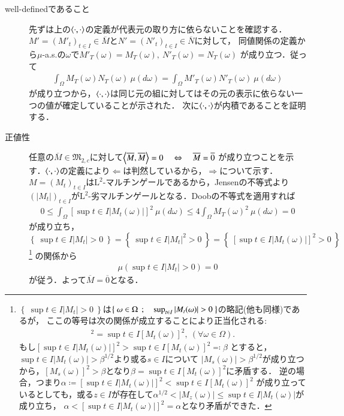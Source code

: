 \begin{description}
			\begin{prf}\mbox{}
				\begin{description}
					\item[well-definedであること]
						先ずは上の$\inprod<\cdot,\cdot>$の定義が代表元の取り方に依らないことを確認する．
						$M' = (M'_t)_{t \in I} \in \overline{M}$と$N' = (N'_t)_{t \in I} \in \overline{N}$に対して，
						同値関係の定義から$\mu$-a.s.の$\omega$で$M'_T(\omega) = M_T(\omega),\ N'_T(\omega) = N_T(\omega)$
						が成り立つ．従って
						\begin{align}
							\int_{\Omega} M_T(\omega)N_T(\omega)\ \mu(d\omega) = \int_{\Omega} M'_T(\omega)N'_T(\omega)\ \mu(d\omega)
						\end{align}
						が成り立つから，$\inprod<\cdot,\cdot>$は同じ元の組に対してはその元の表示に依らない一つの値が確定していることが示された．
						次に$\inprod<\cdot,\cdot>$が内積であることを証明する．
			
					\item[正値性]
						任意の$\overline{M} \in \mathfrak{M}_{2,c}$に対して$\inprod<\overline{M},\overline{M}> = 0 \quad \Leftrightarrow \quad \overline{M} = \overline{0}$
						が成り立つことを示す．$\inprod<\cdot,\cdot>$の定義により$\Leftarrow$は判然しているから，$\Rightarrow$について示す．
						$M = (M_t)_{t \in I}$は$\mathrm{L}^2$-マルチンゲールであるから，Jensenの不等式より
						$(|M_t|)_{t \in I}$が$\mathrm{L}^2$-劣マルチンゲールとなる．Doobの不等式を適用すれば
						\begin{align}
							0 \leq \int_{\Omega} [\sup{t \in I}{|M_t(\omega)|}]^2\ \mu(d\omega) \leq 4 \int_{\Omega} {M_T(\omega)}^2\ \mu(d\omega) = 0
						\end{align}
						が成り立ち，$\left\{\ \sup{t \in I}{|M_t|} > 0\ \right\} = \left\{\ \sup{t \in I}{|M_t|^2} > 0\ \right\} = \left\{\ [\sup{t \in I}{|M_t(\omega)|}]^2 > 0\ \right\}$
						\footnote{
							$\left\{\ \sup{t \in I}{|M_t|} > 0\ \right\}$は$\left\{\ \omega \in \Omega\ \, ; \quad \operatorname*{sup}_{t \in I} |M_t(\omega)| > 0\ \right\}$の略記(他も同様)であるが，
							ここの等号は次の関係が成立することにより正当化される:
							\begin{align}
								[\sup{t \in I}{|M_t(\omega)|}]^2 = \sup{t \in I}{[M_t(\omega)]^2},\ (\forall \omega \in \Omega).
							\end{align}
							もし$[\sup{t \in I}{|M_t(\omega)|}]^2 > \sup{t \in I}{[M_t(\omega)]^2} \eqqcolon \beta$
							とすると，$\sup{t \in I}{|M_t(\omega)|} > \beta^{1/2}$より或る$s \in I$について
							$|M_s(\omega)| > \beta^{1/2}$が成り立つから，$[M_s(\omega)]^2 > \beta$となり$\beta = \sup{t \in I}{[M_t(\omega)]^2}$に矛盾する．
							逆の場合，つまり$\alpha \coloneqq [\sup{t \in I}{|M_t(\omega)|}]^2 < \sup{t \in I}{[M_t(\omega)]^2}$
							が成り立っているとしても，或る$z \in I$が存在して$\alpha^{1/2} < |M_z(\omega)| \leq \sup{t \in I}{|M_t(\omega)|}$が成り立ち，
							$\alpha < [\sup{t \in I}{|M_t(\omega)|}]^2 = \alpha$となり矛盾ができた．
						}
						の関係から
						\begin{align}
							\mu(\sup{t \in I}{|M_t|} > 0) = 0
						\end{align}
						が従う．よって$\overline{M} = \overline{0}$となる．
			

\end{description}
\end{prf}
\end{description}
